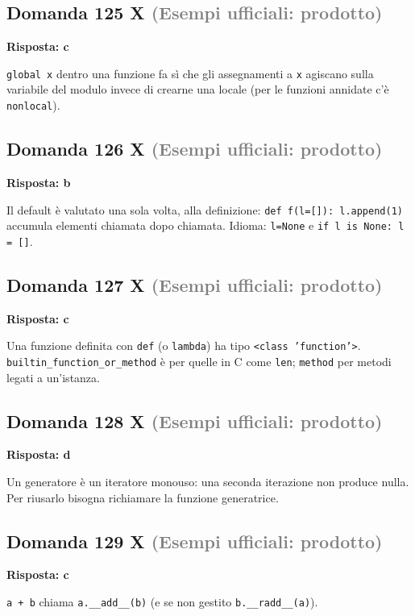 \documentclass[a4paper,11pt]{article}
\begin{document}
\subsection*{Domanda 125 X \hfill {\small \textcolor{gray}{(Esempi ufficiali: prodotto)}}}
\textbf{Risposta: c}\par
\texttt{global x} dentro una funzione fa sì che gli assegnamenti a \texttt{x} agiscano sulla variabile del modulo invece di crearne una locale (per le funzioni annidate c'è \texttt{nonlocal}).



\subsection*{Domanda 126 X \hfill {\small \textcolor{gray}{(Esempi ufficiali: prodotto)}}}
\textbf{Risposta: b}\par
Il default è valutato una sola volta, alla definizione: \texttt{def f(l=[]): l.append(1)} accumula elementi chiamata dopo chiamata. Idioma: \texttt{l=None} e \texttt{if l is None: l = []}.



\subsection*{Domanda 127 X \hfill {\small \textcolor{gray}{(Esempi ufficiali: prodotto)}}}
\textbf{Risposta: c}\par
Una funzione definita con \texttt{def} (o \texttt{lambda}) ha tipo \texttt{\textless{}class 'function'\textgreater{}}. \texttt{builtin\_function\_or\_method} è per quelle in C come \texttt{len}; \texttt{method} per metodi legati a un'istanza.



\subsection*{Domanda 128 X \hfill {\small \textcolor{gray}{(Esempi ufficiali: prodotto)}}}
\textbf{Risposta: d}\par
Un generatore è un iteratore monouso: una seconda iterazione non produce nulla. Per riusarlo bisogna richiamare la funzione generatrice.



\subsection*{Domanda 129 X \hfill {\small \textcolor{gray}{(Esempi ufficiali: prodotto)}}}
\textbf{Risposta: c}\par
\texttt{a + b} chiama \texttt{a.\_\_add\_\_(b)} (e se non gestito \texttt{b.\_\_radd\_\_(a)}).
\end{document}
